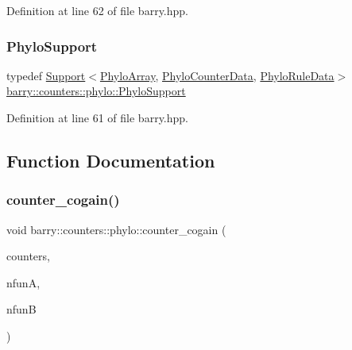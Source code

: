 Definition at line 62 of file barry.\+hpp.

\mbox{\label{namespacebarry_1_1counters_1_1phylo_a29ed06e87d808c2e7d333aa00a0643b5}} 
\subsubsection{\texorpdfstring{Phylo\+Support}{PhyloSupport}}
{\footnotesize\ttfamily typedef \hyperlink{classbarry_1_1_support}{Support}$<$\hyperlink{namespacebarry_1_1counters_1_1phylo_abd293bf65e494e903639fb5fb2c91604}{Phylo\+Array}, \hyperlink{namespacebarry_1_1counters_1_1phylo_a6ecc0d8ab76f8dc2db152221a8e9e95a}{Phylo\+Counter\+Data}, \hyperlink{namespacebarry_1_1counters_1_1phylo_a5da540950bcf3372bcedb17a5b23667c}{Phylo\+Rule\+Data}$>$ \hyperlink{namespacebarry_1_1counters_1_1phylo_a29ed06e87d808c2e7d333aa00a0643b5}{barry\+::counters\+::phylo\+::\+Phylo\+Support}}



Definition at line 61 of file barry.\+hpp.



\subsection{Function Documentation}
\mbox{\label{namespacebarry_1_1counters_1_1phylo_a7b614c5e464ad5a20740c77ab1f1c206}} 
\subsubsection{\texorpdfstring{counter\+\_\+cogain()}{counter\_cogain()}}
{\footnotesize\ttfamily void barry\+::counters\+::phylo\+::counter\+\_\+cogain (\begin{DoxyParamCaption}\item[{\hyperlink{namespacebarry_1_1counters_1_1phylo_a4e401ffe66d04091343dcffaf915f8c3}{Phylo\+Counters} $\ast$}]{counters,  }\item[{\hyperlink{namespacebarry_a11dfc53ddb4672278319aa04f1e09a6c}{uint}}]{nfunA,  }\item[{\hyperlink{namespacebarry_a11dfc53ddb4672278319aa04f1e09a6c}{uint}}]{nfunB }\end{DoxyParamCaption})\hspace{0.3cm}{\ttfamily [inline]}}



